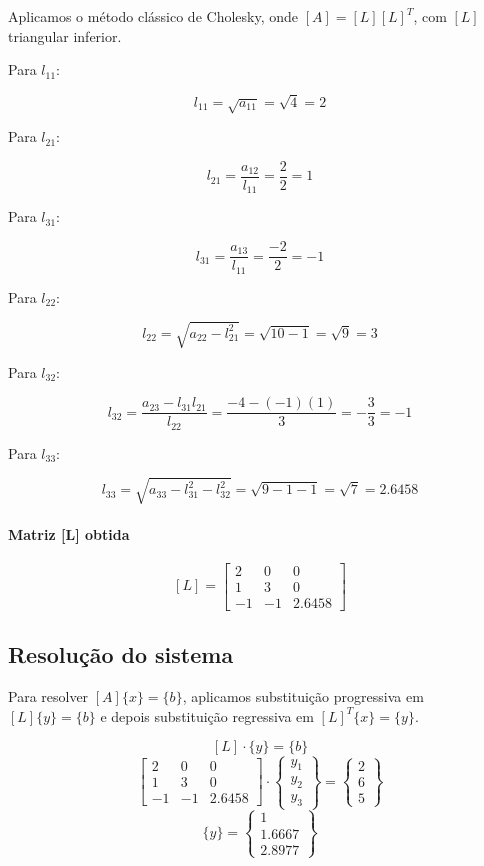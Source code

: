 \documentclass[12pt]{article}
\begin{document}
Aplicamos o método clássico de Cholesky, onde $[A] = [L][L]^T$, com $[L]$ triangular inferior.

Para $l_{11}$:

\[
l_{11} = \sqrt{a_{11}} = \sqrt{4} = 2
\]

Para $l_{21}$:

\[
l_{21} = \frac{a_{12}}{l_{11}} = \frac{2}{2} = 1
\]

Para $l_{31}$:

\[
l_{31} = \frac{a_{13}}{l_{11}} = \frac{-2}{2} = -1
\]

Para $l_{22}$:

\[
l_{22} = \sqrt{a_{22} - l_{21}^2} = \sqrt{10 - 1} = \sqrt{9} = 3
\]

Para $l_{32}$:

\[
l_{32} = \frac{a_{23} - l_{31}l_{21}}{l_{22}} = \frac{-4 - (-1)(1)}{3} = -\frac{3}{3} = -1
\]

Para $l_{33}$:

\[
l_{33} = \sqrt{a_{33} - l_{31}^2 - l_{32}^2} = \sqrt{9 - 1 - 1} = \sqrt{7} = 2.6458
\]

\hspace{2cm}
\paragraph{Matriz [L] obtida}

\[
[L] = \begin{bmatrix}
2 & 0 & 0 \\
1 & 3 & 0 \\
-1 & -1 & 2.6458
\end{bmatrix}
\]

\subsection{Resolução do sistema}

Para resolver $[A]\{x\} = \{b\}$, aplicamos substituição progressiva em $[L]\{y\} = \{b\}$ e depois substituição regressiva em $[L]^T\{x\} = \{y\}$.

\[
[L] \cdot \{y\} = \{b\}
\]
\[
\begin{bmatrix}
2 & 0 & 0 \\
1 & 3 & 0 \\
-1 & -1 & 2.6458
\end{bmatrix} \cdot
\begin{Bmatrix}
y_1 \\
y_2 \\
y_3
\end{Bmatrix} =
\begin{Bmatrix}
2 \\
6 \\
5
\end{Bmatrix}
\]
\[
\{y\} = \begin{Bmatrix}
  1 \\
  1.6667 \\
  2.8977
\end{Bmatrix}
\]
\end{document}
